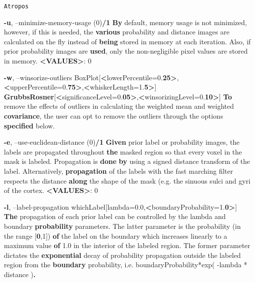 \documentclass[ignorenonframetext,]{beamer}
\newenvironment{Shaded}{\begin{snugshade}}{\end{snugshade}}
\newcommand{\KeywordTok}[1]{\textcolor[rgb]{0.13,0.29,0.53}{\textbf{{#1}}}}
\newcommand{\NormalTok}[1]{{#1}}
\begin{document}
\begin{frame}[fragile]{\texttt{Atropos}}
\begin{Shaded}
\begin{Highlighting}[]
{     \KeywordTok{-u}\NormalTok{, --minimize-memory-usage (0)}\KeywordTok{/1}
          \KeywordTok{By} \NormalTok{default, memory usage is not minimized, however, if this is needed, the}
          \KeywordTok{various} \NormalTok{probability and distance images are calculated on the fly instead of}
          \KeywordTok{being} \NormalTok{stored in memory at each iteration. Also, if prior probability images are}
          \KeywordTok{used}\NormalTok{, only the non-negligible pixel values are stored in memory.}
          \KeywordTok{<VALUES>}\NormalTok{: 0}

     \KeywordTok{-w}\NormalTok{, --winsorize-outliers BoxPlot[}\KeywordTok{<}\NormalTok{lowerPercentile=0.}\KeywordTok{25>}\NormalTok{,}\KeywordTok{<}\NormalTok{upperPercentile=0.}\KeywordTok{75>}\NormalTok{,}\KeywordTok{<}\NormalTok{whiskerLength=1.}\KeywordTok{5>}\NormalTok{]}
                              \KeywordTok{GrubbsRosner}\NormalTok{[}\KeywordTok{<}\NormalTok{significanceLevel=0.}\KeywordTok{05>}\NormalTok{,}\KeywordTok{<}\NormalTok{winsorizingLevel=0.}\KeywordTok{10>}\NormalTok{]}
          \KeywordTok{To} \NormalTok{remove the effects of outliers in calculating the weighted mean and weighted}
          \KeywordTok{covariance}\NormalTok{, the user can opt to remove the outliers through the options}
          \KeywordTok{specified} \NormalTok{below.}

     \KeywordTok{-e}\NormalTok{, --use-euclidean-distance (0)}\KeywordTok{/1}
          \KeywordTok{Given} \NormalTok{prior label or probability images, the labels are propagated throughout}
          \KeywordTok{the} \NormalTok{masked region so that every voxel in the mask is labeled. Propagation is}
          \KeywordTok{done} \KeywordTok{by} \NormalTok{using a signed distance transform of the label. Alternatively,}
          \KeywordTok{propagation} \NormalTok{of the labels with the fast marching filter respects the distance}
          \KeywordTok{along} \NormalTok{the shape of the mask (e.g. the sinuous sulci and gyri of the cortex.}
          \KeywordTok{<VALUES>}\NormalTok{: 0}

     \KeywordTok{-l}\NormalTok{, --label-propagation whichLabel[lambda=0.0,}\KeywordTok{<}\NormalTok{boundaryProbability=1.}\KeywordTok{0>}\NormalTok{]}
          \KeywordTok{The} \NormalTok{propagation of each prior label can be controlled by the lambda and boundary}
          \KeywordTok{probability} \NormalTok{parameters. The latter parameter is the probability (in the range}
          \NormalTok{[}\KeywordTok{0}\NormalTok{,1]) }\KeywordTok{of} \NormalTok{the label on the boundary which increases linearly to a maximum value}
          \KeywordTok{of} \NormalTok{1.0 in the interior of the labeled region. The former parameter dictates the}
          \KeywordTok{exponential} \NormalTok{decay of probability propagation outside the labeled region from the}
          \KeywordTok{boundary} \NormalTok{probability, i.e. boundaryProbability*exp( -lambda * distance )}\KeywordTok{.}

}
\end{Highlighting}
\end{Shaded}
\end{frame}
\end{document}
